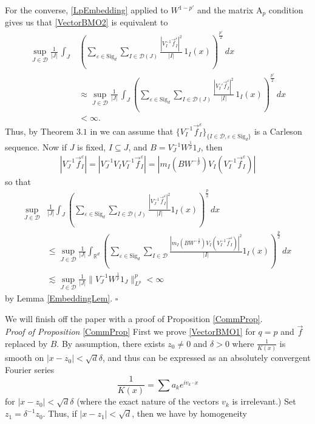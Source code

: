 \documentclass[12pt,reqno ]{amsart}
\numberwithin{equation}{section}
\theoremstyle{definition}
\newcommand{\Rd}{\ensuremath{\mathbb{R}^d}}
\newcommand{\D}{\ensuremath{\mathscr{D}}}
\newcommand{\V}[1]{\ensuremath{\vec{#1}}}
\newcommand{\inrd}{\ensuremath{\int_{\Rd}}}
\renewcommand{\S}{\ensuremath{\text{Sig}_d}}
\begin{document}
For the converse, \eqref{LpEmbedding} applied to $W^{1 - p'}$ and the matrix A${}_p$ condition gives us that  \eqref{VectorBMO2} is equivalent to \begin{align*} \sup_{J \in \D} \frac{1}{|J|} \, \int_J & \left( \sum_{\varepsilon \in \S} \sum_{I \in \D(J)} \frac{|V_I ^{-1} \V{f}_I ^\varepsilon |^2}{|I|} \, 1_I (x)  \right)^\frac{p'}{2} \, dx \\ & \approx \sup_{J \in \D} \frac{1}{|J|} \, \int_J \left( \sum_{\varepsilon \in \S} \sum_{I \in \D(J)} \frac{|V_I ' \V{f}_I ^\varepsilon|^2}{|I|} \, 1_I (x)  \right)^\frac{p'}{2} \, dx \\ & < \infty.   \end{align*}  Thus,  by Theorem $3.1$ in \cite{NTV}  we can assume that $\{V_I ^{-1}  \vec{f}_I ^\varepsilon\}_{\{I \in \D, \varepsilon \in \S\}} $ is a Carleson sequence. Now if $J$ is fixed, $I \subseteq J$,  and $B = V_J ^{-1} W^\frac{1}{p} 1_J $, then
\begin{align*}  |V_J ^{-1} \V{f}_I ^\varepsilon| = |V_J ^{-1} V_I V_I ^{-1} \V{f}_I ^\varepsilon| = |m_I (B W^{-\frac{1}{p}} ) V_I (V_I ^{-1} \V{f}_I ^\varepsilon)| \end{align*} so that \begin{align*} \sup_{J \in \D} & \frac{1}{|J|} \int_J \left(\sum_{\varepsilon \in \S} \sum_{I \in \D(J)} \frac{| V_J ^{-1}  \vec{f}_I ^\varepsilon|^2}{|I|} 1_I(x) \right)^\frac{p}{2} \, dx  \\ & \leq \sup_{J \in \D}  \frac{1}{|J|} \inrd \left(\sum_{\varepsilon \in \S} \sum_{I \in \D} \frac{|m_I (B W^{-\frac{1}{p}} ) V_I (V_I ^{-1} \V{f}_I ^\varepsilon)|^2}{|I|} 1_I(x) \right)^\frac{p}{2} \, dx \\ & \lesssim \sup_{J \in \D}  \frac{1}{|J|} \|V_J ^{-1} W^\frac{1}{p} 1_J \|_{L^p}^p  < \infty  \end{align*} by Lemma \ref{EmbeddingLem}.  \hfill $\square$


We will finish off the paper with a proof of Proposition \ref{CommProp}. \\

\noindent \textit{Proof of Proposition} \ref{CommProp} First we prove \eqref{VectorBMO1} for $q = p$ and $\vec{f}$ replaced by $B$.   By assumption, there exists $z_0 \neq 0 $  and $\delta > 0$ where $\frac{1}{K(x)}$ is smooth on $|x - z_0| < \sqrt{d} \delta$, and thus can be expressed as an absolutely convergent Fourier series \begin{equation*} \frac{1}{K(x)} = \sum a_k e^{i v_k \cdot x} \end{equation*} \noindent for $|x - z_0| < \sqrt{d} \delta$ (where the exact nature of the vectors $v_k$ is irrelevant.)  Set $z_1 = \delta^{-1} z_0$.  Thus, if $|x - z_1| < \sqrt{d}$, then we have by homogeneity
\end{document}
